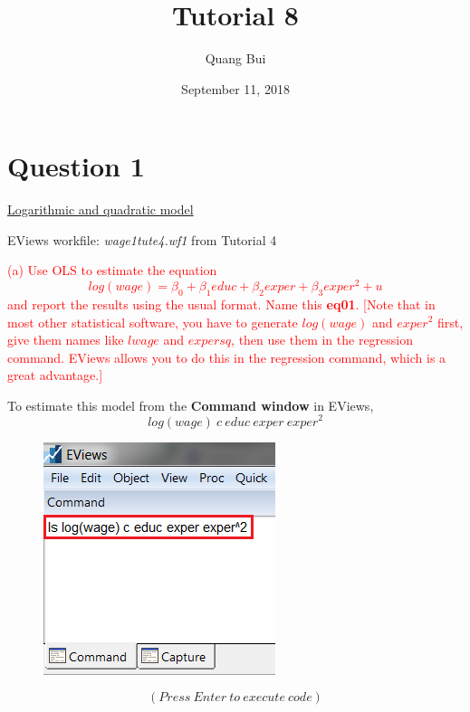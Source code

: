 \documentclass[12pt]{report}
\title{Tutorial 8}
\subtitle
{
	\textbf{keywords}: binary variables, dummy variables, intercept, slope, conditional expectation, regression line, F-test, prediction intervals, prediction uncertainty, estimation uncertainty, variation in error, sum of squared residuals, confidence intervals, standard errors
	
	\textbf{estimated reading time}: 36 minutes
}
\author{Quang Bui}
\date{September 11, 2018}
\begin{document}
	
\maketitle

\newpage
\section*{Question 1}
\noindent \uline{Logarithmic and quadratic model}

\noindent EViews workfile: \textit{wage1tute4.wf1} from Tutorial 4

\noindent \textcolor{red}
{
	(a) Use OLS to estimate the equation
	$$log(wage) = \beta_0 + \beta_1educ + \beta_2exper + \beta_3exper^2 + u$$
	and report the results using the usual format. Name this \textbf{eq01}. [Note that in most other statistical software, you have to generate $log(wage)$ and $exper^2$ first, give them names like $lwage$ and $expersq$, then use them in the regression command. EViews allows you to do this in the regression command, which is a great advantage.]
}

\noindent To estimate this model from the \textbf{Command window} in EViews,
$$log(wage)\ c\ educ\ exper\ exper^2$$
\begin{figure}[H]
	\centering
	\includegraphics{tute8_q1_1}
\end{figure}
\vspace{-\baselineskip}
\noindent $$(Press\ Enter\ to\ execute\ code)$$
\end{document}
